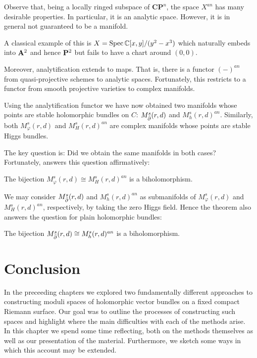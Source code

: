 \documentclass[12pt]{ociamthesis}  %
\begin{document}
Observe that, being a locally ringed subspace of $\mathbf{CP}^n$,
the space $X^{an}$ has many desirable properties. In particular, it is
an analytic space. However, it is in general not guaranteed to
be a manifold.

\begin{example}
  A classical example of this is $X=\operatorname{Spec} \mathbb C[x,y]/(y^2-x^3)$
  which naturally embeds into $\mathbf{A}^{2}_{}$ and hence $\mathbf{P}^{2}_{}$
  but fails to have a chart around $(0,0)$.
\end{example}

Moreover, analytification extends to maps. That is, there is a
functor $(-)^{an}$ from quasi-projective schemes to analytic spaces.
Fortunately, this restricts to a functor from smooth projective varieties
to complex manifolds.

Using the analytification functor we have now obtained two
manifolds whose points are stable holomorphic bundles on $C$:
$M^s_{\bar{\partial}}(r,d)$ and $M^s_h(r,d)^{an}$. Similarly,
both $M^s_\varphi(r,d)$ and $M^s_H(r,d)^{an}$ are complex manifolds
whose points are stable Higgs bundles.

The key question is: Did we obtain the same manifolds in both cases?
Fortunately, \cite[Theorem C]{fan2020} answers this question affirmatively:

\begin{theorem}
  The bijection
  $M^s_\varphi(r,d) \cong M^s_H(r,d)^{an}$
  is a biholomorphism.
\end{theorem}

We may consider $M^s_{\bar{\partial}}(r,d)$ and $M^s_h(r,d)^{an}$ as submanifolds
of $M^s_\varphi(r,d)$ and $M^s_H(r,d)^{an}$, respectively, by taking
the zero Higgs field. Hence the theorem also answers the question for plain
holomorphic bundles:

\begin{corollary}
  The bijection
  $M^s_{\bar{\partial}}(r,d) \cong M^s_h(r,d)^{an}$
  is a biholomorphism.
\end{corollary}

\chapter{Conclusion}

In the preceeding chapters we explored two fundamentally different
approaches to constructing moduli spaces of holomorphic vector
bundles on a fixed compact Riemann surface. Our goal was to
outline the processes of constructing such spaces and highlight where
the main difficulties with each of the methods arise.
In this chapter we spend some time reflecting, both on the methods
themselves as well as our presentation of the material.
Furthermore, we sketch some ways in which this account may be
extended.
\end{document}
